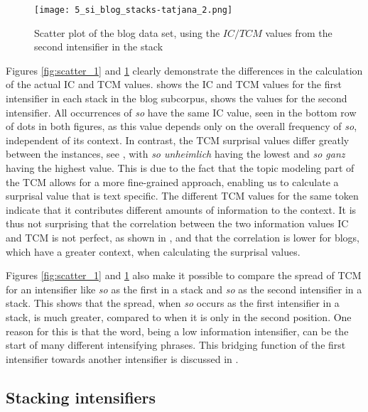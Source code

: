 \documentclass[output=paper,colorlinks,citecolor=brown]{langscibook}
\begin{document}
\begin{figure}
  \centering
%   
  \texttt{[image: 5\_si\_blog\_stacks-tatjana\_2.png]}
  \caption{Scatter plot of the blog data set, using the $IC/TCM$ values from the second intensifier in the stack}
  \label{fig:scatter_2}
\end{figure}

Figures \ref{fig:scatter_1} and \ref{fig:scatter_2} clearly demonstrate the differences in the calculation of the actual IC and TCM values.  shows the IC and TCM values for the first intensifier in each stack in the blog subcorpus,  shows the values for the second intensifier. 
All occurrences of \textit{so} have the same IC value, seen in the bottom row of dots in both figures, as this value depends only on the overall frequency of \textit{so}, independent of its context.  In contrast, the TCM surprisal values differ greatly between the instances, see , with \textit{so unheimlich} having the lowest and \textit{so ganz} having the highest value. This is due to the fact that the topic modeling part of the TCM allows for a more fine-grained approach, enabling us to calculate a surprisal value that is text specific. The different TCM values for the same token indicate that it contributes different amounts of information to the context. It is thus not surprising that the correlation between the two information values IC and TCM is not perfect, as shown in , and that the correlation is lower for blogs, which have a greater context, when calculating the surprisal values.

Figures \ref{fig:scatter_1} and \ref{fig:scatter_2}  also make it possible to compare the spread of TCM for an intensifier like \textit{so} as the first in a stack and \textit{so} as the second intensifier in a stack. This shows that the spread, when \textit{so} occurs as the first intensifier in a stack, is much greater, compared to when it is only in the second position. One reason for this is that the word, being a low information intensifier, can be the start of many different intensifying phrases. This bridging function of the first intensifier towards another intensifier is discussed in .

\subsection{Stacking intensifiers}
\end{document}

